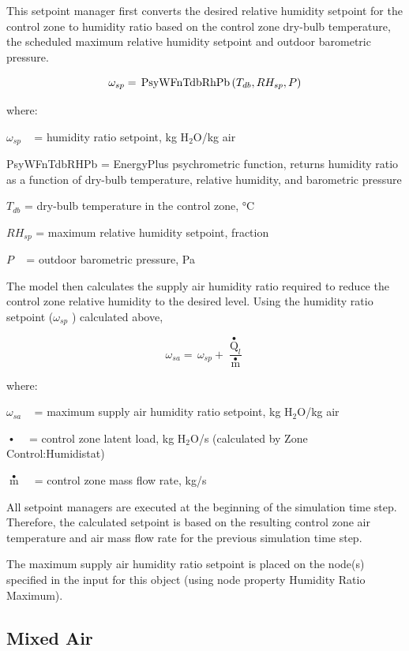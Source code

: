 This setpoint manager first converts the desired relative humidity setpoint for the control zone to humidity ratio based on the control zone dry-bulb temperature, the scheduled maximum relative humidity setpoint and outdoor barometric pressure.

\begin{equation}
{\omega_{sp}} = \,{\rm{PsyWFnTdbRhPb}}\left( {{T_{db}},R{H_{sp}},P} \right)
\end{equation}

where:

\({\omega_{sp}}\) ~ = humidity ratio setpoint, kg H\(_{2}\)O/kg air

PsyWFnTdbRHPb = EnergyPlus psychrometric function, returns humidity ratio as a function of dry-bulb temperature, relative humidity, and barometric pressure

\({T_{db}}\) = dry-bulb temperature in the control zone, °C

\(R{H_{sp}}\) = maximum relative humidity setpoint, fraction

\(P\) ~ = outdoor barometric pressure, Pa

The model then calculates the supply air humidity ratio required to reduce the control zone relative humidity to the desired level. Using the humidity ratio setpoint (\({\omega_{sp}}\) ) calculated above,

\begin{equation}
{\omega_{sa}} = \,{\omega_{sp}} + \frac{{{{\mathop Q\limits^ \bullet  }_l}}}{{\mathop m\limits^ \bullet  }}
\end{equation}

where:

\({\omega_{sa}}\) ~ = maximum supply air humidity ratio setpoint, kg H\(_{2}\)O/kg air

\(\mathop {{Q_l}}\limits^ \bullet\) ~ = control zone latent load, kg H\(_{2}\)O/s (calculated by Zone Control:Humidistat)

\(\mathop m\limits^ \bullet\) ~ = control zone mass flow rate, kg/s

All setpoint managers are executed at the beginning of the simulation time step. Therefore, the calculated setpoint is based on the resulting control zone air temperature and air mass flow rate for the previous simulation time step.

The maximum supply air humidity ratio setpoint is placed on the node(s) specified in the input for this object (using node property Humidity Ratio Maximum).

\subsection{Mixed Air}\label{mixed-air}

